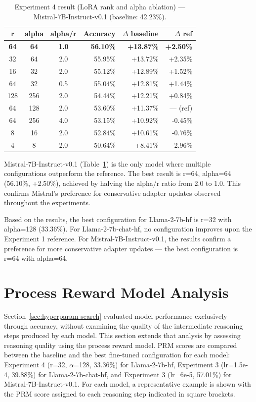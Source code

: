  \begin{table}[ht]
  \caption{Experiment 4 result (LoRA rank and alpha ablation) --- Mistral-7B-Instruct-v0.1 (baseline: 42.23\%).}
  \centering
  \footnotesize
  \begin{tabular}{cccrrr}
  \toprule
  \textbf{r} & \textbf{alpha} & \textbf{alpha/r} & \textbf{Accuracy} & \textbf{$\Delta$ baseline} & \textbf{$\Delta$ ref} \\
  \midrule
  \textbf{64} & \textbf{64}  & \textbf{1.0} & \textbf{56.10\%} & \textbf{+13.87\%} & \textbf{+2.50\%} \\
  32  & 64  & 2.0 & 55.95\% & +13.72\% & +2.35\% \\
  16  & 32  & 2.0 & 55.12\% & +12.89\% & +1.52\% \\
  64  & 32  & 0.5 & 55.04\% & +12.81\% & +1.44\% \\
  128 & 256 & 2.0 & 54.44\% & +12.21\% & +0.84\% \\
  64  & 128 & 2.0 & 53.60\% & +11.37\% & --- (ref) \\
  64  & 256 & 4.0 & 53.15\% & +10.92\% & -0.45\% \\
  8   & 16  & 2.0 & 52.84\% & +10.61\% & -0.76\% \\
  4   & 8   & 2.0 & 50.64\% & +8.41\%  & -2.96\% \\
  \bottomrule
  \end{tabular}

  \label{tab:exp4-mistral}
  \end{table}

  Mistral-7B-Instruct-v0.1 (Table~\ref{tab:exp4-mistral}) is the
  only model where multiple configurations outperform the reference.
  The best result is r=64, alpha=64 (56.10\%, +2.50\%), achieved by
  halving the alpha/r ratio from 2.0 to 1.0. This confirms Mistral's
  preference for conservative adapter updates observed throughout
  the experiments.

  Based on the results, the best configuration for
  Llama-2-7b-hf is r=32 with alpha=128 (33.36\%).
  For Llama-2-7b-chat-hf, no configuration improves
  upon the Experiment 1 reference. For
  Mistral-7B-Instruct-v0.1, the results confirm a
  preference for more conservative adapter updates ---
  the best configuration is r=64 with alpha=64.
\section{Process Reward Model Analysis}
\label{sec:prm-analysis}
  Section~\ref{sec:hyperparam-search} evaluated
  model performance exclusively through accuracy,
  without examining the quality of the intermediate
  reasoning steps produced by each model. This
  section extends that analysis by assessing
  reasoning quality using the process reward model.
  PRM scores are compared between the baseline and
  the best fine-tuned configuration for each model:
  Experiment 4 (r=32, $\alpha$=128,
  33.36\%) for Llama-2-7b-hf, Experiment 3
  (lr=1.5e-4, 39.88\%) for Llama-2-7b-chat-hf,
  and Experiment 3 (lr=6e-5, 57.01\%) for
  Mistral-7B-Instruct-v0.1.                                                             
  For each model, a representative example is shown
  with the PRM score assigned to each reasoning step
  indicated in square brackets.

